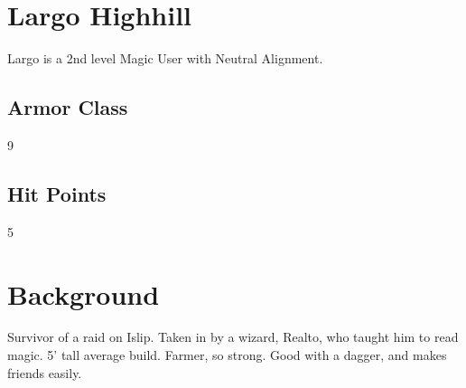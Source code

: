 \documentclass[a4paper]{article}
\begin{document}
\begin{multicols}{2}
\section{Largo Highhill}
Largo is a 2nd level Magic User with Neutral Alignment.
  \subsection{Armor Class}
  9
  \subsection{Hit Points}
  5
\columnbreak

\section{Background}
Survivor of a raid on Islip.  Taken in by a wizard, Realto, who taught him to read magic. 5' tall
average build.  Farmer, so strong.  Good with a dagger, and makes friends easily.

\end{multicols}

\hrulefill
\end{document}
